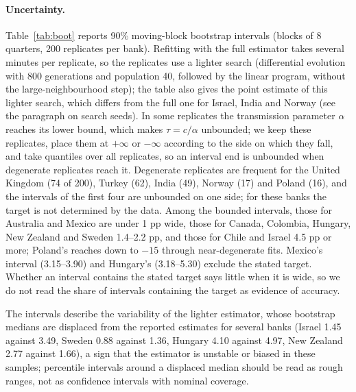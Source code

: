\documentclass[pdflatex,sn-basic]{sn-jnl}
\theoremstyle{thmstyleone}\newtheorem{proposition}{Proposition}\newtheorem{theorem}{Theorem}
\theoremstyle{thmstylethree}\newtheorem{remark}{Remark}
\begin{document}
\paragraph{Uncertainty.} Table~\ref{tab:boot} reports 90\% moving-block bootstrap intervals (blocks of 8 quarters, 200 replicates per bank). Refitting with the full estimator takes several minutes per replicate, so the replicates use a lighter search (differential evolution with 800 generations and population 40, followed by the linear program, without the large-neighbourhood step); the table also gives the point estimate of this lighter search, which differs from the full one for Israel, India and Norway (see the paragraph on search seeds). In some replicates the transmission parameter $\alpha$ reaches its lower bound, which makes $\tau=c/\alpha$ unbounded; we keep these replicates, place them at $+\infty$ or $-\infty$ according to the side on which they fall, and take quantiles over all replicates, so an interval end is unbounded when degenerate replicates reach it. Degenerate replicates are frequent for the United Kingdom (74 of 200), Turkey (62), India (49), Norway (17) and Poland (16), and the intervals of the first four are unbounded on one side; for these banks the target is not determined by the data. Among the bounded intervals, those for Australia and Mexico are under 1 pp wide, those for Canada, Colombia, Hungary, New Zealand and Sweden 1.4--2.2 pp, and those for Chile and Israel 4.5 pp or more; Poland's reaches down to $-15$ through near-degenerate fits. Mexico's interval (3.15--3.90) and Hungary's (3.18--5.30) exclude the stated target. Whether an interval contains the stated target says little when it is wide, so we do not read the share of intervals containing the target as evidence of accuracy.

The intervals describe the variability of the lighter estimator, whose bootstrap medians are displaced from the reported estimates for several banks (Israel 1.45 against 3.49, Sweden 0.88 against 1.36, Hungary 4.10 against 4.97, New Zealand 2.77 against 1.66), a sign that the estimator is unstable or biased in these samples; percentile intervals around a displaced median should be read as rough ranges, not as confidence intervals with nominal coverage.
\end{document}
